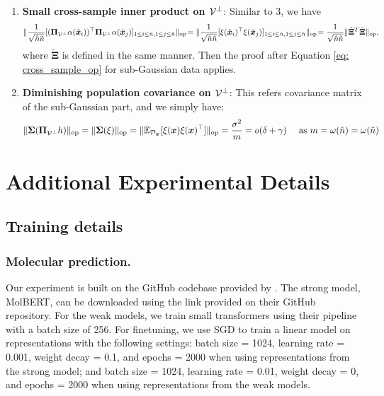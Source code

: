 \begin{enumerate}
        
        \item \textbf{Small cross-sample inner product on ${\mathcal{V}}^\perp$}: Similar to 3, we have
        \[
            \lVert  \frac{1}{\sqrt{\hat{n}\tilde{n}}}[ ({\bm{\Pi}}_{{\mathcal{V}}^\perp}\alpha(\hat{{\bm{x}}}_i))^\top {\bm{\Pi}}_{{\mathcal{V}}^\perp}\alpha(\tilde{{\bm{x}}}_j)  ]_{1\leq i\leq\hat{n}, 1\leq j \leq \tilde{n}}  \rVert_{\mathrm{op}}\! = \lVert  \frac{1}{\sqrt{\hat{n}\tilde{n}}}[\xi(\hat{{\bm{x}}}_i)^\top \xi(\tilde{{\bm{x}}}_j)  ]_{1\leq i\leq\hat{n}, 1\leq j \leq \tilde{n}}  \rVert_{\mathrm{op}}\! =  \frac{1}{\sqrt{\hat{n}\tilde{n}}}\lVert  \hat{\mathbf{\Xi}}^T\tilde{\mathbf{\Xi}} \rVert_{\mathrm{op}}, 
        \]
        where $\tilde{\mathbf{\Xi}}$ is defined in the same manner. Then the proof after Equation \ref{eq: cross_sample_op} for sub-Gaussian data applies. 
        \item \textbf{Diminishing population covariance on ${\mathcal{V}}^\perp$}: This refers covariance matrix of the sub-Gaussian part, and we simply have: 
        \[
            \lVert  {\bm{\Sigma}}({\bm{\Pi}}_{{\mathcal{V}}^\perp}h)  \rVert_{\mathrm{op}}= \lVert  {\bm{\Sigma}}(\xi)  \rVert_{\mathrm{op}} = \lVert \mathbb{E}_{{\mathcal{D}}_{{\bm{x}}}}[\xi({\bm{x}})\xi({\bm{x}})^\top] \rVert_{\mathrm{op}} = \frac{\sigma^2}{m} = o(\delta + \gamma) \quad \text{ as $m = \omega(\hat{n}) = \omega(\tilde{n})$}
        \]
    \end{enumerate}

\section{Additional Experimental Details}\label{apdx: exp}

\subsection{Training details}\label{apdx: training_details}


\subsubsection{Molecular prediction.}

Our experiment is built on the GitHub codebase provided by \cite{fabian2020molecular}. The strong model, MolBERT, can be downloaded using the link provided on their GitHub repository. For the weak models, we train small transformers using their pipeline with a batch size of 256. For finetuning, we use SGD to train a linear model on representations with the following settings: batch size = 1024, learning rate = 0.001, weight decay = 0.1, and epochs = 2000 when using representations from the strong model; and batch size = 1024, learning rate = 0.01, weight decay = 0, and epochs = 2000 when using representations from the weak models.

